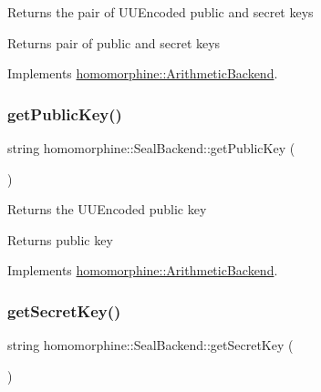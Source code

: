 Returns the pair of U\+U\+Encoded public and secret keys

\begin{DoxyReturn}{Returns}
pair of public and secret keys 
\end{DoxyReturn}


Implements \hyperlink{classhomomorphine_1_1_arithmetic_backend_a71bb86054685708001c636e3085d578c}{homomorphine\+::\+Arithmetic\+Backend}.

\mbox{\label{classhomomorphine_1_1_seal_backend_aa2dce269303eaa73c62dbfacce66dc1a}} 
\subsubsection{\texorpdfstring{get\+Public\+Key()}{getPublicKey()}}
{\footnotesize\ttfamily string homomorphine\+::\+Seal\+Backend\+::get\+Public\+Key (\begin{DoxyParamCaption}{ }\end{DoxyParamCaption})\hspace{0.3cm}{\ttfamily [virtual]}}

Returns the U\+U\+Encoded public key

\begin{DoxyReturn}{Returns}
public key 
\end{DoxyReturn}


Implements \hyperlink{classhomomorphine_1_1_arithmetic_backend_a26f31fc0c76cf58636972f68142b9a06}{homomorphine\+::\+Arithmetic\+Backend}.

\mbox{\label{classhomomorphine_1_1_seal_backend_a8ad57a68eb8a02d162ba439046565471}} 
\subsubsection{\texorpdfstring{get\+Secret\+Key()}{getSecretKey()}}
{\footnotesize\ttfamily string homomorphine\+::\+Seal\+Backend\+::get\+Secret\+Key (\begin{DoxyParamCaption}{ }\end{DoxyParamCaption})\hspace{0.3cm}{\ttfamily [virtual]}}

